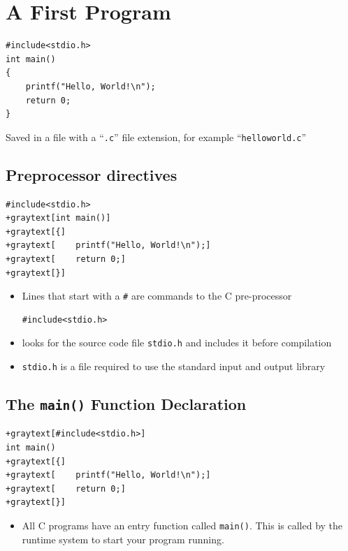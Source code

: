 \documentclass{article}
\begin{document}
\section{A First Program}

\begin{verbatim}
#include<stdio.h>
int main() 
{    
    printf("Hello, World!\n");    
    return 0;
}
\end{verbatim}

Saved in a file with a ``\verb!.c!'' file extension,
for example ``\verb!helloworld.c!''


\newcommand{\graytext}[1]{\textcolor{gray}{#1}}


\subsection{Preprocessor directives}
\begin{Verbatim}[commandchars=+\[\]]
#include<stdio.h>
+graytext[int main()]
+graytext[{]
+graytext[    printf("Hello, World!\n");]
+graytext[    return 0;]
+graytext[}]
\end{Verbatim}

\begin{itemize}
\item Lines that start with a \verb!#! are commands to the C pre-processor
\begin{Verbatim}
#include<stdio.h> 
\end{Verbatim}
\item looks for the source code file \verb!stdio.h! and includes it before compilation
\item \verb!stdio.h!  is a file required to use the standard input and output library
\end{itemize}



\subsection{The \texttt{main()} Function Declaration}
\begin{Verbatim}[commandchars=+\[\]]
+graytext[#include<stdio.h>]
int main()
+graytext[{]
+graytext[    printf("Hello, World!\n");]
+graytext[    return 0;]
+graytext[}]
\end{Verbatim}

\begin{itemize}
\item All C programs have an entry function called \verb!main()!.
This is called by the runtime system to start your program running.
\end{itemize}
\end{document}
